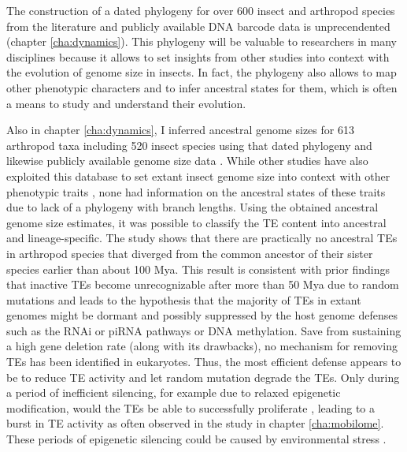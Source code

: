 The construction of a dated phylogeny for over 600 insect and arthropod
species from the literature and publicly available DNA barcode data is
unprecendented (chapter \ref{cha:dynamics}). This phylogeny will be
valuable to researchers in many disciplines because it allows to set
insights from other studies into context with the evolution of genome
size in insects.  In fact, the phylogeny also allows to map other
phenotypic characters and to infer ancestral states for them, which is
often a means to study and understand their evolution.

Also in chapter \ref{cha:dynamics}, I inferred ancestral genome sizes
for 613 arthropod taxa including 520 insect species using that dated
phylogeny and likewise publicly available genome size data
\citep{Gregory2018}. While other studies have also exploited this
database to set extant insect genome size into context with other
phenotypic traits \citep{Alfsnes2017, Gregory2011}, none had information
on the ancestral states of these traits due to lack of a phylogeny with
branch lengths. Using the obtained ancestral genome size estimates, it
was possible to classify the TE content into ancestral and
lineage-specific. The study shows that there are practically no
ancestral TEs in arthropod species that diverged from the common
ancestor of their sister species earlier than about 100 Mya. This result
is consistent with prior findings that inactive TEs become
unrecognizable after more than 50 Mya due to random mutations
\citep{Shedlock2000} and leads to the hypothesis that the majority of
TEs in extant genomes might be dormant and possibly suppressed by the
host genome defenses such as the RNAi or piRNA pathways or DNA
methylation. Save from sustaining a high gene deletion rate (along with
its drawbacks), no mechanism for removing TEs has been identified in
eukaryotes. Thus, the most efficient defense appears to be to reduce TE
activity and let random mutation degrade the TEs. Only during a period
of inefficient silencing, for example due to relaxed epigenetic
modification, would the TEs be able to successfully proliferate
\citep{Slotkin2007, Zeh2009, Rebollo2010}, leading to a burst in TE
activity as often observed in the study in chapter \ref{cha:mobilome}.
These periods of epigenetic silencing could be caused by environmental
stress \citep{Horvath2017, Horvath2017-1}.

